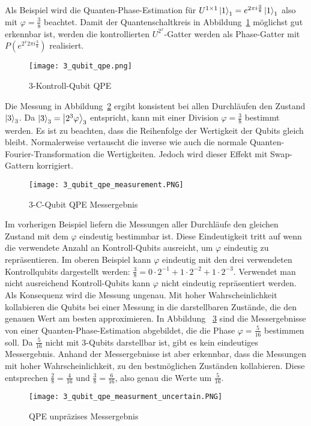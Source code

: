 Als Beispiel wird die Quanten-Phase-Estimation für
\(U^{1\times 1}\ket{1}_1=e^{2\pi i \frac{3}{8}}\ket{1}_1\) also mit \(\varphi = \frac{3}{8}\)
beachtet.
Damit der Quantenschaltkreis in Abbildung~\ref{fig:3_qubit_qpe} möglichst gut erkennbar ist,
werden die kontrollierten \(U^{2^x}\)-Gatter werden als Phase-Gatter mit \(P(e^{2^x 2\pi i \frac{3}{8}})\) realisiert.
\begin{figure}
  \caption{3-Kontroll-Qubit QPE}
  \label{fig:3_qubit_qpe}
  \texttt{[image: 3\_qubit\_qpe.png]}
  \centering
  \end{figure}
Die Messung in Abbildung~\ref{fig:3_qubit_qpe_measurement} ergibt konsistent bei allen Durchläufen den Zustand \(\ket{3}_3\).
Da \(\ket{3}_3 = \ket{2^3\varphi}_3\) entspricht, kann mit einer Division \(\varphi = \frac{3}{8}\) bestimmt werden.
Es ist zu beachten, dass die Reihenfolge der Wertigkeit der Qubits gleich bleibt.
Normalerweise vertauscht die inverse wie auch die normale Quanten-Fourier-Transformation die Wertigkeiten.
Jedoch wird dieser Effekt mit Swap-Gattern korrigiert.
\begin{figure}
\caption{3-C-Qubit QPE Messergebnis}
\label{fig:3_qubit_qpe_measurement}
\texttt{[image: 3\_qubit\_qpe\_measurement.PNG]}
\centering
\end{figure}

Im vorherigen Beispiel liefern die Messungen aller Durchläufe den gleichen Zustand mit dem \(\varphi\) eindeutig bestimmbar ist.
Diese Eindeutigkeit tritt auf wenn die verwendete Anzahl an Kontroll-Qubits ausreicht, 
um \(\varphi\) eindeutig zu repräsentieren.
Im oberen Beispiel kann \(\varphi\) eindeutig mit den drei verwendeten Kontrollqubits dargestellt werden:
\({\frac{3}{8} =0 \cdot 2^{-1} + 1\cdot2^{-2} + 1\cdot2^{-3}}\).
Verwendet man nicht ausreichend Kontroll-Qubits kann \(\varphi\) nicht eindeutig repräsentiert werden.
Als Konsequenz wird die Messung ungenau.
Mit hoher Wahrscheinlichkeit kollabieren die Qubits bei einer Messung 
in die darstellbaren Zustände, die den genauen Wert am besten approximieren.
In Abbildung ~\ref*{fig:3_qubit_qpe_measurment_uncertain} sind die Messergebnisse von einer Quanten-Phase-Estimation
abgebildet, die die Phase \(\varphi = \frac{5}{16}\) bestimmen soll.
Da \(\frac{5}{16}\) nicht mit 3-Qubits darstellbar ist, gibt es kein eindeutiges Messergebnis.
Anhand der Messergebnisse ist aber erkennbar, dass die Messungen mit hoher Wahrscheinlichkeit,
zu den bestmöglichen Zuständen kollabieren.
Diese entsprechen \({\frac{2}{8} = \frac{4}{16}}\) und \({\frac{3}{8} = \frac{6}{16}}\), 
also genau die Werte um \(\frac{5}{16}\).


\begin{figure}
  \caption{QPE unpräzises Messergebnis}
  \label{fig:3_qubit_qpe_measurment_uncertain}
  \texttt{[image: 3\_qubit\_qpe\_measurment\_uncertain.PNG]}
  \centering
  \end{figure}












 






 











